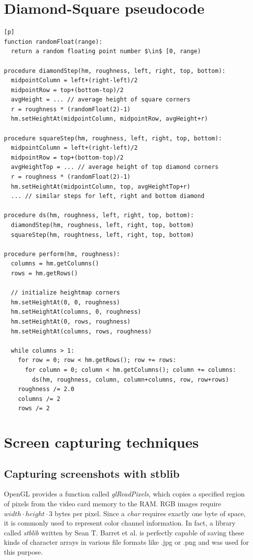 \documentclass[11pt,a4paper,twoside,openright]{report}
\begin{document}
\chapter{Diamond-Square pseudocode}
\label{app:dspseudo}
\begin{lstlisting}[caption=DS pseudocode, mathescape=true][p]
function randomFloat(range):
  return a random floating point number $\in$ [0, range)

procedure diamondStep(hm, roughness, left, right, top, bottom):
  midpointColumn = left+(right-left)/2
  midpointRow = top+(bottom-top)/2
  avgHeight = ... // average height of square corners
  r = roughness * (randomFloat(2)-1)
  hm.setHeightAt(midpointColumn, midpointRow, avgHeight+r)

procedure squareStep(hm, roughness, left, right, top, bottom):
  midpointColumn = left+(right-left)/2
  midpointRow = top+(bottom-top)/2
  avgHeightTop = ... // average height of top diamond corners
  r = roughness * (randomFloat(2)-1)
  hm.setHeightAt(midpointColumn, top, avgHeightTop+r)
  ... // similar steps for left, right and bottom diamond

procedure ds(hm, roughness, left, right, top, bottom):
  diamondStep(hm, roughness, left, right, top, bottom)
  squareStep(hm, roughtness, left, right, top, bottom)

procedure perform(hm, roughness):
  columns = hm.getColumns()
  rows = hm.getRows()

  // initialize heightmap corners
  hm.setHeightAt(0, 0, roughness)
  hm.setHeightAt(columns, 0, roughness)
  hm.setHeightAt(0, rows, roughness)
  hm.setHeightAt(columns, rows, roughness)

  while columns > 1:
    for row = 0; row < hm.getRows(); row += rows:
      for column = 0; column < hm.getColumns(); column += columns:
        ds(hm, roughness, column, column+columns, row, row+rows)
    roughness /= 2.0
    columns /= 2
    rows /= 2
\end{lstlisting}

\chapter{Screen capturing techniques}

\section{Capturing screenshots with stblib}
OpenGL provides a function called \emph{glReadPixels}, which copies a specified region of pixels from the video card memory to the RAM. RGB images require $width \cdot height \cdot 3$ bytes per pixel. Since a \emph{char} requires exactly one byte of space, it is commonly used to represent color channel information. In fact, a library called \emph{stblib} written by Sean T. Barret et al. is perfectly capable of saving these kinds of character arrays in various file formats like .jpg or .png and was used for this purpose.
\end{document}

